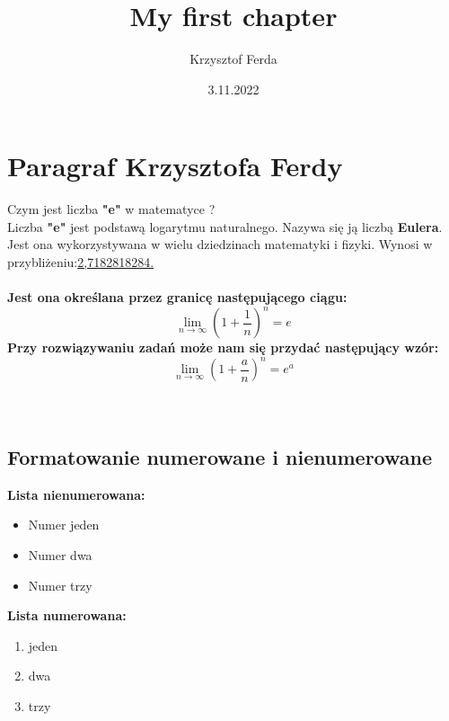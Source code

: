 \documentclass{article}
\title{My first chapter}
\author{Krzysztof Ferda}
\date{3.11.2022}
\begin{document}
\maketitle

\section {Paragraf Krzysztofa Ferdy}
Czym jest liczba \textbf{"e"} w matematyce ?
\\
Liczba \textbf{"e"} jest podstawą logarytmu naturalnego. Nazywa się ją liczbą \textbf{Eulera}. Jest ona wykorzystywana w wielu dziedzinach matematyki i fizyki. Wynosi w przybliżeniu:\underline{2,7182818284.}
\\
\\
\textbf{Jest ona określana przez granicę następującego ciągu:}
    \begin{equation} \label{eq:1}
        \lim_{n \to \infty }\left({1+\frac{1}{n}}\right)^n=e
    \end{equation}
\textbf{Przy rozwiązywaniu zadań może nam się przydać następujący wzór:}
    \begin{equation} \label{eq:2}
        \lim_{n \to \infty }\left({1+\frac{a}{n}}\right)^n=e^a
    \end{equation}
\\
\\
\subsection{Formatowanie numerowane i nienumerowane}

\textbf{Lista nienumerowana:}
\begin{itemize}
  \item Numer jeden
  \item Numer dwa
  \item Numer trzy
\end{itemize}

\textbf{Lista numerowana:}
\begin{enumerate}
    \item jeden 
    \item dwa
    \item trzy
\end{enumerate}
\\
\\
\\
\\
\\
\end{document}
